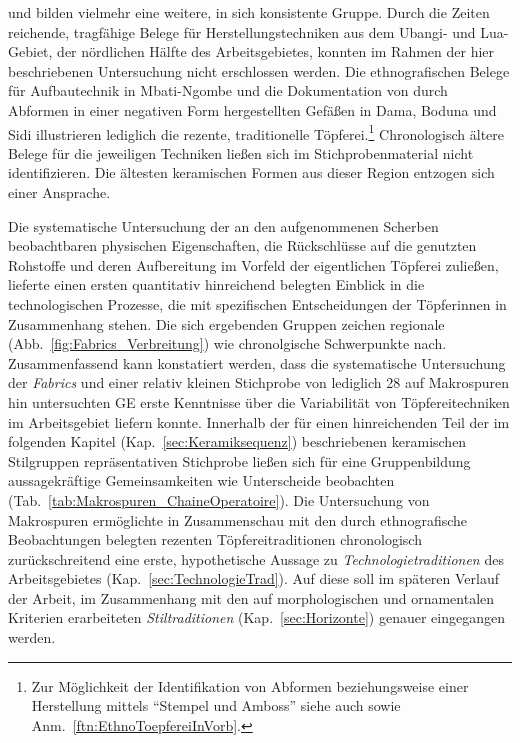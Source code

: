 \begin{multicols}{2}
und bilden vielmehr eine weitere, in sich konsistente Gruppe. Durch die Zeiten reichende, tragfähige Belege für Herstellungstechniken aus dem \mbox{Ubangi}- und Lua-Gebiet, der nördlichen Hälfte des Arbeitsgebietes, konnten im Rahmen der hier beschriebenen Untersuchung nicht erschlossen werden. Die ethnografischen Belege für Aufbautechnik in Mbati-Ngombe und die Dokumentation von durch Abformen in einer negativen Form hergestellten Gefäßen in Dama, Boduna und Sidi illustrieren lediglich die rezente, traditionelle Töpferei.\footnote{Zur Möglichkeit der Identifikation von Abformen beziehungsweise einer Herstellung mittels \enquote{Stempel und Amboss} siehe auch \textcite{Martineau.2005} sowie Anm.~\ref{ftn:EthnoToepfereiInVorb}.} Chronologisch ältere Belege für die jeweiligen Techniken ließen sich im Stichprobenmaterial nicht identifizieren. Die ältesten keramischen Formen aus dieser Region entzogen sich einer Ansprache.

Die systematische Untersuchung der an den aufgenommenen Scherben beobachtbaren physischen Eigenschaften, die Rückschlüsse auf die genutzten Rohstoffe und deren Aufbereitung im Vorfeld der eigentlichen Töpferei zuließen, lieferte einen ersten quantitativ hinreichend belegten Einblick in die technologischen Prozesse, die mit spezifischen Entscheidungen der Töpferinnen in Zusammenhang stehen. Die sich ergebenden Gruppen zeichen regionale (Abb.~\ref{fig:Fabrics_Verbreitung}) wie chronolgische Schwerpunkte nach. Zusammenfassend kann konstatiert werden, dass die systematische Untersuchung der \textit{Fabrics} und einer relativ kleinen Stichprobe von lediglich 28 auf Makrospuren hin untersuchten GE erste Kenntnisse über die Variabilität von Töpfereitechniken im Arbeitsgebiet liefern konnte. Innerhalb der für einen hinreichenden Teil der im folgenden Kapitel (Kap.~\ref{sec:Keramiksequenz}) beschriebenen keramischen Stilgruppen repräsentativen Stichprobe ließen sich für eine Gruppenbildung aussagekräftige Gemeinsamkeiten wie Unterscheide beobachten (Tab.~\ref{tab:Makrospuren_ChaineOperatoire}). Die Untersuchung von Makrospuren ermöglichte in Zusammenschau mit den durch ethnografische Beobachtungen belegten rezenten Töpfereitraditionen chronologisch zurückschreitend eine erste, hypothetische Aussage zu \textit{Technologietraditionen} des Arbeitsgebietes (Kap.~\ref{sec:TechnologieTrad}). Auf diese soll im späteren Verlauf der Arbeit, im Zusammenhang mit den auf morphologischen und ornamentalen Kriterien erarbeiteten \textit{Stiltraditionen} (Kap.~\ref{sec:Horizonte}) genauer eingegangen werden.
\end{multicols}